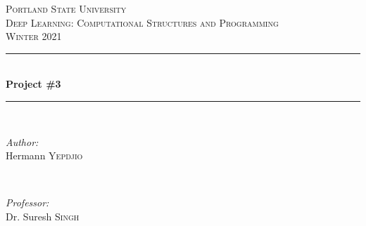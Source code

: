 \documentclass[12pt]{article}
\begin{document}
	
	\begin{titlepage}
		
		\newcommand{\HRule}{\rule{\linewidth}{0.5mm}} %
		
		\center %
		
		
		\textsc{\LARGE Portland State University}\\[1.5cm] %
		\textsc{\Large Deep Learning: Computational Structures and Programming}\\[0.5cm] %
		\textsc{\large Winter 2021}\\[0.5cm] %
		
		
		\HRule \\[0.4cm]
		{ \huge \bfseries Project \#3}\\[0.4cm] %
		\HRule \\[1.5cm]
		
		
		\begin{minipage}{0.4\textwidth}
			\begin{flushleft} \large
				\emph{Author:}\\
				Hermann \textsc{Yepdjio} %
			\end{flushleft}
		\end{minipage}
		~
		\begin{minipage}{0.4\textwidth}
			\begin{flushright} \large
				\emph{Professor:} \\
				Dr. Suresh \textsc{Singh} %
			\end{flushright}
		\end{minipage}\\[1cm]
		

\end{titlepage}
\end{document}
